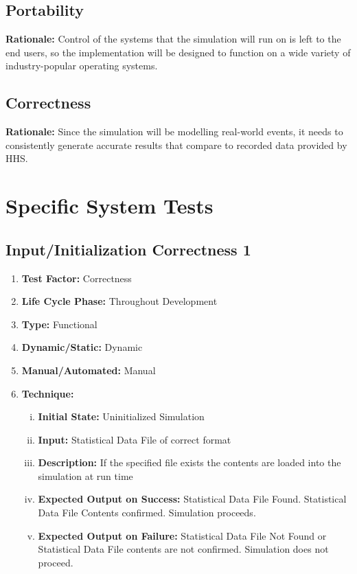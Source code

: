 \documentclass[paper=letter, fontsize=10pt]{scrartcl}
\numberwithin{equation}{section}		%
\numberwithin{figure}{section}			%
\numberwithin{table}{section}				%
\begin{document}
\subsection{Portability} 
\textbf{Rationale:} Control of the systems that the simulation will run on is left to the end users, so the implementation will be designed to function on a wide variety of industry-popular operating systems.
\subsection{Correctness}
\textbf{Rationale:} Since the simulation will be modelling real-world events, it needs to consistently generate accurate results that compare to recorded data provided by HHS.  

\section{Specific System Tests}
\subsection{Input/Initialization Correctness 1}
\begin{enumerate}[]
	\item \textbf{Test Factor:} Correctness  
	\item \textbf{Life Cycle Phase:} Throughout Development
	\item \textbf{Type:} Functional
	\item \textbf{Dynamic/Static:} Dynamic
	\item \textbf{Manual/Automated:} Manual
	\item \textbf{Technique:}
		\begin{enumerate}[(i)]
			\item \textbf{Initial State:} Uninitialized Simulation   
			\item \textbf{Input:} Statistical Data File of correct format
			\item \textbf{Description:} If the specified file exists the contents are loaded into the simulation at run time
			\item \textbf{Expected Output on Success:} Statistical Data File Found. Statistical Data File Contents confirmed. Simulation proceeds.
			\item \textbf{Expected Output on Failure:} Statistical Data File Not Found or Statistical Data File contents are not confirmed. Simulation does not proceed.
		\end{enumerate}
\end{enumerate}
\end{document}
